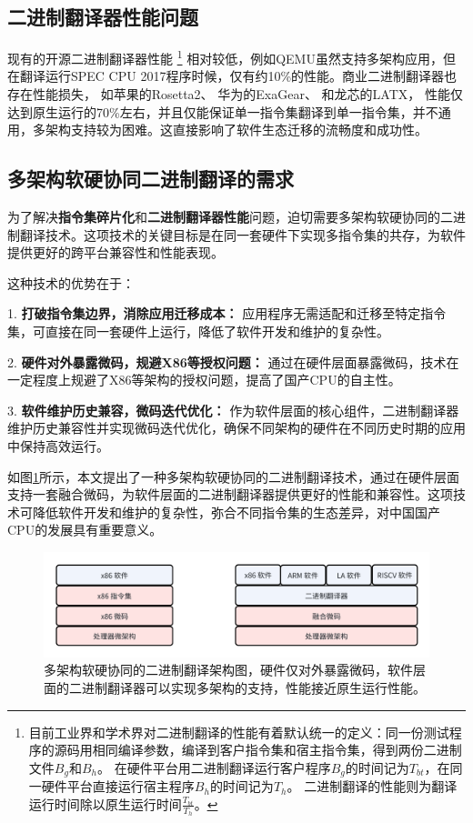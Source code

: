 \documentclass{Style/ucasproposal}%
\begin{document}
\subsection{二进制翻译器性能问题}
现有的开源二进制翻译器性能
\footnote{
    目前工业界和学术界对二进制翻译的性能有着默认统一的定义：同一份测试程序的源码用相同编译参数，编译到客户指令集和宿主指令集，得到两份二进制文件$B_g$和$B_h$。
    在硬件平台用二进制翻译运行客户程序$B_g$的时间记为$T_{bt}$，在同一硬件平台直接运行宿主程序$B_h$的时间记为$T_h$。
    二进制翻译的性能则为翻译运行时间除以原生运行时间$\frac{T_{bt}}{T_h}$。
}
相对较低，例如QEMU\cite{bellardQEMUFastPortable2005}虽然支持多架构应用，但在翻译运行SPEC CPU 2017\cite{SPECCPU2017}程序时候，仅有约10\%的性能。商业二进制翻译器也存在性能损失，
如苹果的Rosetta2\cite{RosettaTranslationEnvironment, RunningIntelBinaries}、
华为的ExaGear\cite{KunPengExaGear}、
和龙芯的LATX\cite{LoongArchEnv2022, LoongArch2023}，
性能仅达到原生运行的70\%左右，并且仅能保证单一指令集翻译到单一指令集，并不通用，多架构支持较为困难。这直接影响了软件生态迁移的流畅度和成功性。

\subsection{多架构软硬协同二进制翻译的需求}

为了解决\textbf{指令集碎片化}和\textbf{二进制翻译器性能}问题，迫切需要多架构软硬协同的二进制翻译技术。这项技术的关键目标是在同一套硬件下实现多指令集的共存，为软件提供更好的跨平台兼容性和性能表现。

这种技术的优势在于：

1. \textbf{打破指令集边界，消除应用迁移成本：} 应用程序无需适配和迁移至特定指令集，可直接在同一套硬件上运行，降低了软件开发和维护的复杂性。

2. \textbf{硬件对外暴露微码，规避X86等授权问题：} 通过在硬件层面暴露微码，技术在一定程度上规避了X86等架构的授权问题，提高了国产CPU的自主性。

3. \textbf{软件维护历史兼容，微码迭代优化：} 作为软件层面的核心组件，二进制翻译器维护历史兼容性并实现微码迭代优化，确保不同架构的硬件在不同历史时期的应用中保持高效运行。

如图\ref{img:my_arch}所示，本文提出了一种多架构软硬协同的二进制翻译技术，通过在硬件层面支持一套融合微码，为软件层面的二进制翻译器提供更好的性能和兼容性。这项技术可降低软件开发和维护的复杂性，弥合不同指令集的生态差异，对中国国产CPU的发展具有重要意义。


\begin{figure}[h]
    \centering
    \includegraphics[width=1\linewidth]{./feishuImage/my_arch.png}
    \caption{多架构软硬协同的二进制翻译架构图，硬件仅对外暴露微码，软件层面的二进制翻译器可以实现多架构的支持，性能接近原生运行性能。}
    \label{img:my_arch}
  \end{figure}
\end{document}
